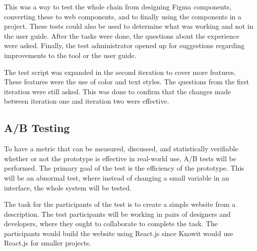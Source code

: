 This was a way to test the whole chain from designing Figma \glspl{component}, converting these to web \glspl{component}, and to finally using the \glspl{component} in a project. These tests could also be used to determine what was working and not in the user guide. After the tasks were done, the questions about the experience were asked. Finally, the test administrator opened up for suggestions regarding improvements to the tool or the user guide. 

The test script was expanded in the second iteration to cover more features. These features were the use of color and text styles. The questions from the first iteration were still asked. This was done to confirm that the changes made between iteration one and iteration two were effective. 


\subsection{ A/B Testing }%
\label{sub:ab-testing}
To have a metric that can be measured, discussed, and statistically verifiable whether or not the prototype is effective in real-world use, A/B tests will be performed.  The primary goal of the test is the efficiency of the prototype. This will be an abnormal test, where instead of changing a small variable in an interface, the whole system will be tested. 




The task for the participants of the test is to create a simple website from a description. The test participants will be working in pairs of designers and developers, where they ought to collaborate to complete the task. The participants would build the website using React.js since Knowit would use React.js for smaller projects.  

